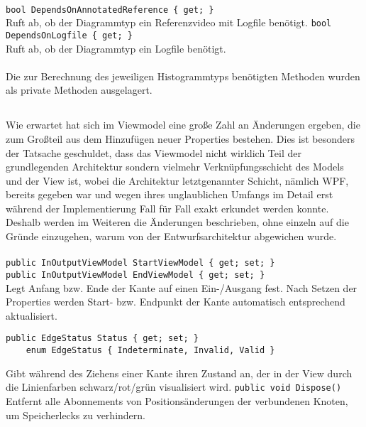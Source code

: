\paragraph{}
\begin{itemize}
	\add \verb!bool DependsOnAnnotatedReference { get; }! \\
	Ruft ab, ob der Diagrammtyp ein Referenzvideo mit Logfile benötigt.
	\add \verb!bool DependsOnLogfile { get; }! \\
	Ruft ab, ob der Diagrammtyp ein Logfile benötigt.
\end{itemize}

\paragraph{}
Die zur Berechnung des jeweiligen Histogrammtyps benötigten Methoden wurden als private Methoden ausgelagert.

\subsection{}

Wie erwartet hat sich im Viewmodel eine große Zahl an Änderungen ergeben, die zum Großteil aus dem Hinzufügen neuer Properties bestehen. Dies ist besonders der Tatsache geschuldet, dass das Viewmodel nicht wirklich Teil der grundlegenden Architektur sondern vielmehr Verknüpfungsschicht des Models und der View ist, wobei die Architektur letztgenannter Schicht, nämlich WPF, bereits gegeben war und wegen ihres unglaublichen Umfangs im Detail erst während der Implementierung Fall für Fall exakt erkundet werden konnte. Deshalb werden im Weiteren die Änderungen beschrieben, ohne einzeln auf die Gründe einzugehen, warum von der Entwurfsarchitektur abgewichen wurde.

\paragraph{}
\begin{itemize}
	\add \verb!public InOutputViewModel StartViewModel { get; set; }! \\
	     \verb!public InOutputViewModel EndViewModel { get; set; }! \\
	Legt Anfang bzw. Ende der Kante auf einen Ein-/Ausgang fest. Nach Setzen der Properties werden Start- bzw. Endpunkt der Kante automatisch entsprechend aktualisiert.
	\add \begin{verbatim}public EdgeStatus Status { get; set; }
	enum EdgeStatus { Indeterminate, Invalid, Valid }
	\end{verbatim}
	Gibt während des Ziehens einer Kante ihren Zustand an, der in der View durch die Linienfarben schwarz/rot/grün visualisiert wird.
	\add \verb!public void Dispose()! \\
	Entfernt alle Abonnements von Positionsänderungen der verbundenen Knoten, um Speicherlecks zu verhindern.
\end{itemize}

